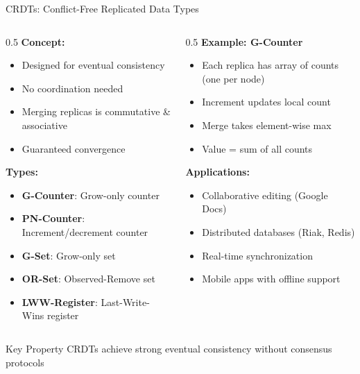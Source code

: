 \documentclass[aspectratio=169,xcolor=dvipsnames]{beamer}
\begin{document}
\begin{frame}{CRDTs: Conflict-Free Replicated Data Types}
  \begin{columns}
    \begin{column}{0.5\textwidth}
      \textbf{Concept:}
      \begin{itemize}
        \item Designed for eventual consistency
        \item No coordination needed
        \item Merging replicas is commutative \& associative
        \item Guaranteed convergence
      \end{itemize}

      \vspace{0.3cm}
      \textbf{Types:}
      \begin{itemize}
        \item \textbf{G-Counter}: Grow-only counter
        \item \textbf{PN-Counter}: Increment/decrement counter
        \item \textbf{G-Set}: Grow-only set
        \item \textbf{OR-Set}: Observed-Remove set
        \item \textbf{LWW-Register}: Last-Write-Wins register
      \end{itemize}
    \end{column}

    \begin{column}{0.5\textwidth}
      \textbf{Example: G-Counter}
      \begin{itemize}
        \item Each replica has array of counts (one per node)
        \item Increment updates local count
        \item Merge takes element-wise max
        \item Value = sum of all counts
      \end{itemize}

      \vspace{0.3cm}
      \textbf{Applications:}
      \begin{itemize}
        \item Collaborative editing (Google Docs)
        \item Distributed databases (Riak, Redis)
        \item Real-time synchronization
        \item Mobile apps with offline support
      \end{itemize}
    \end{column}
  \end{columns}

  \vspace{0.3cm}
  \begin{block}{Key Property}
    CRDTs achieve strong eventual consistency without consensus protocols
  \end{block}
\end{frame}
\end{document}
